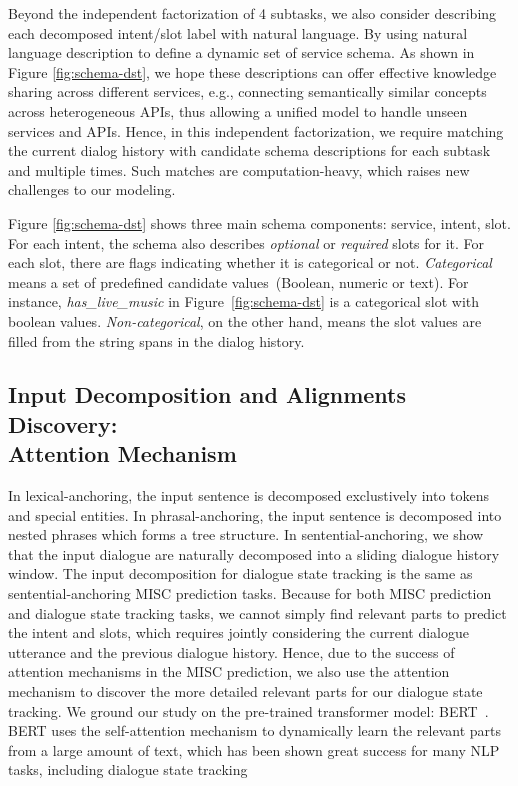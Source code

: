 Beyond the independent factorization of 4 subtasks, we also consider
describing each decomposed intent/slot label with natural
language. By using natural language description to define a dynamic
set of service schema. As shown in Figure \ref{fig:schema-dst}, we
hope these descriptions can offer effective knowledge sharing across
different services, e.g., connecting semantically similar concepts
across heterogeneous APIs, thus allowing a unified model to handle
unseen services and APIs. Hence, in this independent factorization, we
require matching the current dialog history with candidate schema
descriptions for each subtask and multiple times. Such matches are
computation-heavy, which raises new challenges to our modeling.

Figure \ref{fig:schema-dst} shows three
main schema components: service, intent, slot. For each intent, the
schema also describes {\it optional} or {\it required} slots for
it. For each slot, there are flags indicating whether it is
categorical or not. {\it Categorical} means a set of
predefined candidate values~(Boolean, numeric or text). For instance,
{\it has\_live\_music} in Figure~\ref{fig:schema-dst} is a categorical
slot with boolean values. {\it Non-categorical}, on the other hand,
means the slot values are filled from the string spans in the dialog
history.

\subsection[Input Decomposition and Alignments Discovery: Attention]{Input Decomposition and Alignments Discovery: \\Attention Mechanism}
\label{sec:sgd:decompose-x}
In lexical-anchoring, the input sentence is decomposed exclustively
into tokens and special entities. In phrasal-anchoring, the input
sentence is decomposed into nested phrases which forms a tree
structure. In sentential-anchoring, we show that the input dialogue
are naturally decomposed into a sliding dialogue history window. The
input decomposition for dialogue state tracking is the same as
sentential-anchoring MISC prediction tasks. Because for both MISC
prediction and dialogue state tracking tasks, we cannot simply find
relevant parts to predict the intent and slots, which requires jointly
considering the current dialogue utterance and the previous dialogue
history. Hence, due to the success of attention mechanisms in the MISC
prediction, we also use the attention mechanism to discover the more
detailed relevant parts for our dialogue state tracking. We ground our
study on the pre-trained transformer model:
BERT~\cite{devlin2018bert}. BERT uses the self-attention mechanism to
dynamically learn the relevant parts from a large amount of text,
which has been shown great success for many NLP tasks, including
dialogue state tracking~\cite{chao2019bert,noroozi2020fast}

